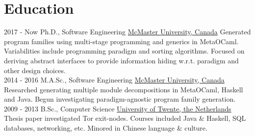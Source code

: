 \documentclass[letterpaper]{twentysecondcv} %
\begin{document}
\makeprofile %



\section{Education}
\vspace{-0.5em}

\begin{twenty} %
\twentyitem
    {2017 - Now}
    {}
    {Ph.D., Software Engineering}%
    {\href{https://www.mcmaster.ca/}{McMaster University, Canada}}
    {}
    {Generated program families using multi-stage programming and generics in MetaOCaml. Variabilities include programming paradigm and sorting algorithms. Focused on deriving abstract interfaces to provide information hiding w.r.t. paradigm and other design choices.}
    \\
  \twentyitem
    {2014 - 2016}
    {}
    {M.A.Sc., Software Engineering}%
    {\href{https://www.mcmaster.ca/}{McMaster University, Canada}}
    {}
    {Researched generating multiple module decompositions in MetaOCaml, Haskell and Java. Begun investigating paradigm-agnostic program family generation.}
    \\
  \twentyitem
    {2009 - 2013}
    {}
    {B.Sc., Computer Science}%
    {\href{https://www.utwente.nl/}{University of Twente, the Netherlands}}
    {}
    {Thesis paper investigated Tor exit-nodes. Courses included Java \& Haskell, SQL databases, networking, etc. Minored in Chinese language \& culture.}
\end{twenty}


\vspace{-0.5em}
\end{document}
